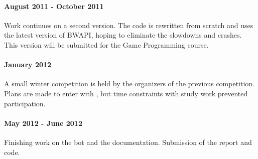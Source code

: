 
\paragraph{August 2011 - October 2011}
Work continues on a second version. The code is rewritten from scratch and uses the latest version of BWAPI, hoping to eliminate the slowdowns and crashes. This version will be submitted for the Game Programming course.  %

\paragraph{January 2012}
A small winter competition is held by the organizers of the previous competition. Plans are made to enter with \massexpand{}, but time constraints with study work prevented participation.

\paragraph{May 2012 - June 2012}
Finishing work on the bot and the documentation. Submission of the report and code.


